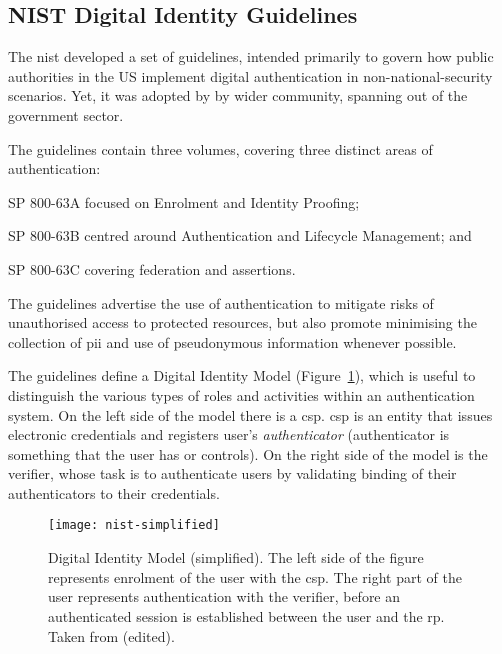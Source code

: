 \subsection{NIST Digital Identity Guidelines}

The \acrfull{nist} developed a set of guidelines, intended primarily to govern how public authorities in the US implement digital authentication in non-national-security scenarios. Yet, it was adopted by by wider community, spanning out of the government sector.

The guidelines contain three volumes, covering three distinct areas of authentication:
\begin{enumerate*}[label=(\roman*)]
    \item SP 800-63A focused on Enrolment and Identity Proofing;
    \item SP 800-63B centred around Authentication and Lifecycle Management; and
    \item SP 800-63C covering federation and assertions.
\end{enumerate*}
The guidelines advertise the use of authentication to mitigate risks of unauthorised access to protected resources, but also promote minimising the collection of \acrfull{pii} and use of pseudonymous information whenever possible.

The guidelines define a Digital Identity Model (Figure~\ref{fig:nist-model}), which is useful to distinguish the various types of roles and activities within an authentication system. On the left side of the model there is a \acrfull{csp}. \acrshort{csp} is an entity that issues electronic credentials and registers user's \textit{authenticator} (authenticator is something that the user has or controls). On the right side of the model is the verifier, whose task is to authenticate users by validating binding of their authenticators to their credentials.

 \begin{figure}[ht]
    \centering
    \texttt{[image: nist-simplified]}
    \caption{Digital Identity Model (simplified). The left side of the figure represents enrolment of the user with the \acrshort{csp}. The right part of the user represents authentication with the verifier, before an authenticated session is established between the user and the \acrshort{rp}. Taken from (edited).
    }
    \label{fig:nist-model}
\end{figure}

